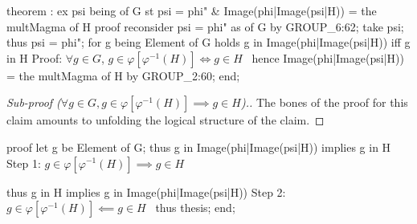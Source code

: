 \nwenddocs{}\endmoddef\nwstartdeflinemarkup{}\nwenddeflinemarkup
theorem :
  ex psi being  of G
  st psi = phi" & Image(phi|Image(psi|H)) = the multMagma of H
proof
  reconsider psi = phi" as  of G by GROUP_6:62;
  take psi;
  thus psi = phi";
  for g being Element of G holds g in Image(phi|Image(psi|H)) iff g in H
  \LA{}Proof: $\forall g\in G$, $g\in\varphi[\varphi^{-1}(H)]\iff g\in H$~{\nwtagstyle{}}\RA{}
  hence Image(phi|Image(psi|H)) = the multMagma of H by GROUP_2:60;
end;
\eatline
{}\nwendcode{}\nwdocspar
\begin{proof}[{Sub-proof ($\forall g\in G, g\in\varphi[\varphi^{-1}(H)]\implies g\in H$)}.]
The bones of the proof for this claim amounts to unfolding the
logical structure of the claim.
\end{proof}

\nwenddocs{}\endmoddef\nwstartdeflinemarkup{}\nwenddeflinemarkup
proof
  let g be Element of G;
  thus g in Image(phi|Image(psi|H)) implies g in H
  \LA{}Step 1: $g\in\varphi[\varphi^{-1}(H)]\implies g\in H$~{\nwtagstyle{}}\RA{}

  thus g in H implies g in Image(phi|Image(psi|H))
  \LA{}Step 2: $g\in\varphi[\varphi^{-1}(H)]\impliedby g\in H$~{\nwtagstyle{}}\RA{}
  thus thesis;
end;
\nwendcode{}\nwdocspar

